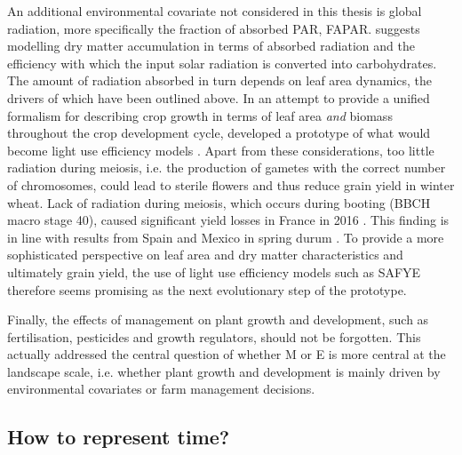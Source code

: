 An additional environmental covariate not considered in this thesis is global radiation, more specifically the fraction of absorbed \gls{PAR}, FAPAR. \cite{monteith_climate_1977} suggests modelling dry matter accumulation in terms of absorbed radiation and the efficiency with which the input solar radiation is converted into carbohydrates. The amount of radiation absorbed in turn depends on leaf area dynamics, the drivers of which have been outlined above. In an attempt to provide a unified formalism for describing crop growth in terms of leaf area \textsl{and} biomass throughout the crop development cycle, \cite{goudriaan_mathematical_1990} developed a prototype of what would become light use efficiency models \citep{gitelson_productivity_2015}. Apart from these considerations, too little radiation during meiosis, i.e. the production of gametes with the correct number of chromosomes, could lead to sterile flowers and thus reduce grain yield in winter wheat. Lack of radiation during meiosis, which occurs during booting (\gls{BBCH} macro stage 40), caused significant yield losses in France in 2016 \citep{le_gouis_how_2020}. This finding is in line with results from Spain and Mexico in spring durum \citep{villegas_daylength_2016}. To provide a more sophisticated perspective on leaf area and dry matter characteristics and ultimately grain yield, the use of light use efficiency models such as \gls{SAFYE} \citep{ma_wheat_2022} therefore seems promising as the next evolutionary step of the prototype.

Finally, the effects of management on plant growth and development, such as fertilisation, pesticides and growth regulators, should not be forgotten. This actually addressed the central question of whether M or E is more central at the landscape scale, i.e. whether plant growth and development is mainly driven by environmental covariates or farm management decisions.

\subsection{How to represent time?}

